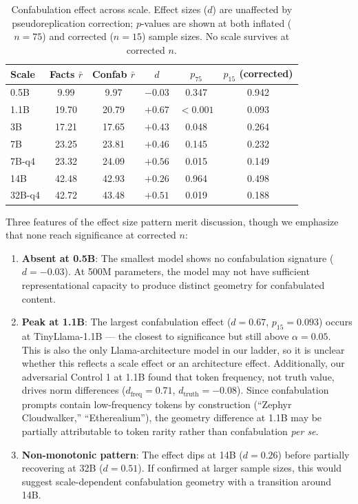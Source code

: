 \documentclass[11pt,a4paper]{article}
\begin{document}
\begin{table}[H]
\centering
\caption{Confabulation effect across scale. Effect sizes ($d$) are unaffected by pseudoreplication correction; $p$-values are shown at both inflated ($n = 75$) and corrected ($n = 15$) sample sizes. No scale survives at corrected $n$.}
\label{tab:confab_detail}
\begin{tabular}{lccccc}
\toprule
\textbf{Scale} & \textbf{Facts $\bar{r}$} & \textbf{Confab $\bar{r}$} & \textbf{$d$} & \textbf{$p_{75}$} & \textbf{$p_{15}$ (corrected)} \\
\midrule
0.5B & 9.99 & 9.97 & $-0.03$ & 0.347 & 0.942 \\
1.1B & 19.70 & 20.79 & $+0.67$ & $< 0.001$ & 0.093 \\
3B & 17.21 & 17.65 & $+0.43$ & 0.048 & 0.264 \\
7B & 23.25 & 23.81 & $+0.46$ & 0.145 & 0.232 \\
7B-q4 & 23.32 & 24.09 & $+0.56$ & 0.015 & 0.149 \\
14B & 42.48 & 42.93 & $+0.26$ & 0.964 & 0.498 \\
32B-q4 & 42.72 & 43.48 & $+0.51$ & 0.019 & 0.188 \\
\bottomrule
\end{tabular}
\end{table}

Three features of the effect size pattern merit discussion, though we emphasize that none reach significance at corrected $n$:

\begin{enumerate}[leftmargin=*]
    \item \textbf{Absent at 0.5B}: The smallest model shows no confabulation signature ($d = -0.03$). At 500M parameters, the model may not have sufficient representational capacity to produce distinct geometry for confabulated content.

    \item \textbf{Peak at 1.1B}: The largest confabulation effect ($d = 0.67$, $p_{15} = 0.093$) occurs at TinyLlama-1.1B --- the closest to significance but still above $\alpha = 0.05$. This is also the only Llama-architecture model in our ladder, so it is unclear whether this reflects a scale effect or an architecture effect. Additionally, our adversarial Control 1 at 1.1B found that token frequency, not truth value, drives norm differences ($d_{\text{freq}} = 0.71$, $d_{\text{truth}} = -0.08$). Since confabulation prompts contain low-frequency tokens by construction (``Zephyr Cloudwalker,'' ``Etherealium''), the geometry difference at 1.1B may be partially attributable to token rarity rather than confabulation \emph{per se}.

    \item \textbf{Non-monotonic pattern}: The effect dips at 14B ($d = 0.26$) before partially recovering at 32B ($d = 0.51$). If confirmed at larger sample sizes, this would suggest scale-dependent confabulation geometry with a transition around 14B.
\end{enumerate}
\end{document}
